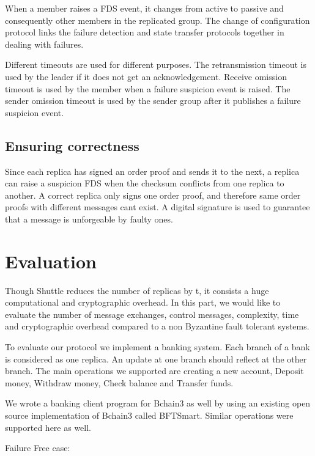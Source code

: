 \documentclass[letterpaper, 10 pt, conference]{ieeeconf}  %
\begin{document}
When a member raises a FDS event, it changes from active to passive and consequently other members in the replicated group.
The change of configuration protocol links the failure detection and state transfer protocols together in dealing with failures.

Different timeouts are used for different purposes. The retransmission timeout is used by the leader if it does not get an acknowledgement. Receive omission timeout is used by the member when a failure suspicion event is raised. 
The sender omission timeout is used by the sender group after it publishes a failure suspicion event.

\subsection{Ensuring correctness}

Since each replica has signed an order proof and sends it to the next, a replica can raise a suspicion FDS when the checksum conflicts from one replica to another. A correct replica only signs one order proof, and therefore same order proofs with different messages cant exist. A digital signature is used to guarantee that a message is unforgeable by faulty ones.



\section{Evaluation}

Though Shuttle reduces the number of replicas by t, it consists a huge computational and cryptographic overhead. In this part, we would like to evaluate the number of message exchanges, control messages, complexity, time and cryptographic overhead compared to a non Byzantine fault tolerant systems. 

To evaluate our protocol we implement a banking system. Each branch of a bank is considered as one replica. An update at one branch should reflect at the other branch. The main operations we supported are creating a new account, Deposit money, Withdraw money, Check balance and Transfer funds. 

We wrote a banking client program for Bchain3 as well by using an existing open source implementation of Bchain3 called BFTSmart. Similar operations were supported here as well. 

Failure Free case:
\end{document}
